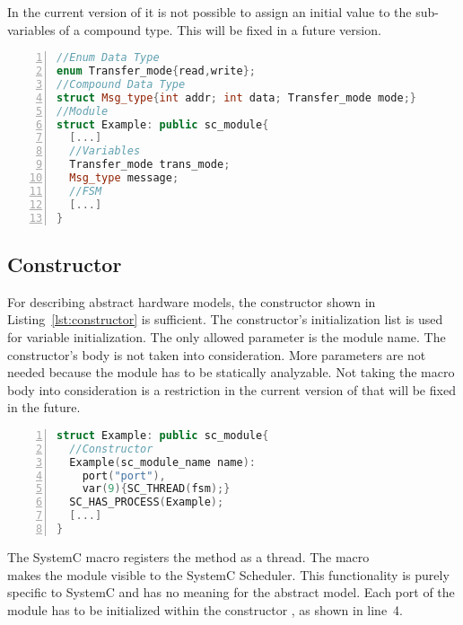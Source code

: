 In the current version of \DeSCAM{} it is not possible to assign an initial value to the sub-variables of a compound type. %
This will be fixed in a future version. %

\begin{lstlisting}[language=C++,
caption={Variables and custom types},
label={lst:variables},
captionpos=b,   
numbers=left,
basicstyle={\footnotesize},
xleftmargin=5.0ex]
//Enum Data Type 
enum Transfer_mode{read,write};
//Compound Data Type
struct Msg_type{int addr; int data; Transfer_mode mode;}
//Module
struct Example: public sc_module{
  [...]
  //Variables
  Transfer_mode trans_mode;
  Msg_type message;
  //FSM
  [...]
}
\end{lstlisting}

\subsection{Constructor}
\label{section:constructor}

For describing abstract hardware models, the constructor shown in
Listing~\ref{lst:constructor} is sufficient. %
The constructor's initialization list is used for variable
initialization. %
The only allowed parameter is the module name. %
The constructor's body is not taken into consideration. %
More parameters are not needed because the module has to be statically
analyzable. %
Not taking the macro body into consideration is a restriction in the
current version of \DeSCAM{} that will be fixed in the future. %



\begin{lstlisting}[language=C++,
caption={Example of a constructor},
label={lst:constructor},
numbers=left,
captionpos=b, 
basicstyle={\footnotesize},
xleftmargin=5.0ex]
struct Example: public sc_module{
  //Constructor
  Example(sc_module_name name):
    port("port"),
    var(9){SC_THREAD(fsm);}
  SC_HAS_PROCESS(Example);
  [...]
}
\end{lstlisting}

The SystemC macro  registers the method
 as a thread. 
The macro \\  makes the module visible to
the SystemC Scheduler. %
This functionality is purely specific to SystemC and has no meaning
for the abstract model. %
Each port of the module has to be initialized within the constructor
, as shown in line~4. %

